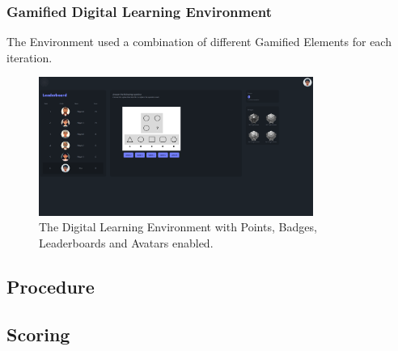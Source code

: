\subsubsection{Gamified Digital Learning Environment}
The Environment used a combination of different Gamified Elements for each iteration.
\begin{figure}[h]
    \centering
    \includegraphics[width=0.8\textwidth]{img/question_screen.png}
    \caption{The Digital Learning Environment with Points, Badges, Leaderboards and Avatars enabled.}
    
    \label{fig:figureMatrix}
\end{figure}
\subsection{Procedure}
\subsection{Scoring}